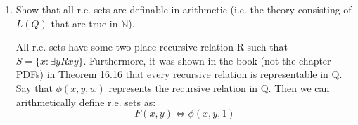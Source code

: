 \begin{enumerate}
  \item
    \begin{question}
      Show that all r.e. sets are definable in arithmetic (i.e. the theory consisting of $L(Q)$ that are true in $\mathds{N}$).
    \end{question}

    All r.e. sets have some two-place recursive relation R such that $S = \{x : \exists y R x y \}$. Furthermore, it was shown in the book (not the chapter PDFs) in Theorem 16.16 that every recursive relation is representable in Q. Say that $\phi(x,y,w)$ represents the recursive relation in Q. Then we can arithmetically define r.e. sets as:
    $$F(x,y) \iff \phi(x,y,1)$$
\end{enumerate}

